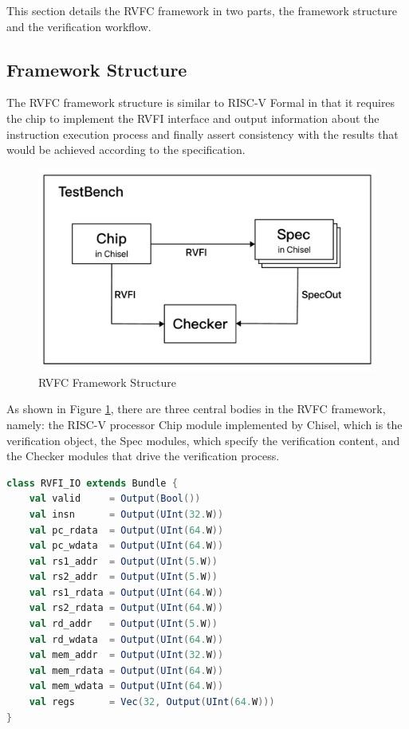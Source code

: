 \documentclass[conference]{IEEEtran}
\theoremstyle{definition}
\begin{document}
This section details the RVFC framework in two parts, the framework structure and the verification workflow.

\subsection{Framework Structure}
The RVFC framework structure is similar to RISC-V Formal in that it requires the chip to implement the RVFI interface and output information about the instruction execution process and finally assert consistency with the results that would be achieved according to the specification.

\begin{figure}[!htbp]
    \begin{center}
    \includegraphics[width=1\linewidth]{pics/rvfc.pdf}
    \caption{RVFC Framework Structure}
    \label{fig: rvfc structure}
    \end{center}
\end{figure}

As shown in Figure \ref{fig: rvfc structure}, there are three central bodies in the RVFC framework, namely: the RISC-V processor Chip module implemented by Chisel, which is the verification object, the Spec modules, which specify the verification content, and the Checker modules that drive the verification process.

\begin{lstlisting}[language=scala, caption={RVFI Definition in RVFC}, label=rvfic]
class RVFI_IO extends Bundle {
    val valid     = Output(Bool())
    val insn      = Output(UInt(32.W))
    val pc_rdata  = Output(UInt(64.W))
    val pc_wdata  = Output(UInt(64.W))
    val rs1_addr  = Output(UInt(5.W))
    val rs2_addr  = Output(UInt(5.W))
    val rs1_rdata = Output(UInt(64.W))
    val rs2_rdata = Output(UInt(64.W))
    val rd_addr   = Output(UInt(5.W))
    val rd_wdata  = Output(UInt(64.W))
    val mem_addr  = Output(UInt(32.W))
    val mem_rdata = Output(UInt(64.W))
    val mem_wdata = Output(UInt(64.W))
    val regs      = Vec(32, Output(UInt(64.W)))
}
\end{lstlisting}
\end{document}
